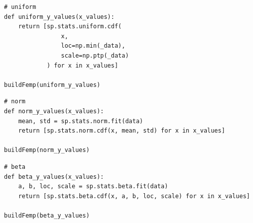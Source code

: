 \documentclass[a4paper, 14pt]{extarticle}
\begin{document}
\begin{lstlisting}
# uniform
def uniform_y_values(x_values):
    return [sp.stats.uniform.cdf(
                x, 
                loc=np.min(_data), 
                scale=np.ptp(_data)
            ) for x in x_values]

buildFemp(uniform_y_values)
\end{lstlisting}

\begin{lstlisting}
# norm 
def norm_y_values(x_values):
    mean, std = sp.stats.norm.fit(data)
    return [sp.stats.norm.cdf(x, mean, std) for x in x_values]

buildFemp(norm_y_values)
\end{lstlisting}

\begin{lstlisting}
# beta 
def beta_y_values(x_values):
    a, b, loc, scale = sp.stats.beta.fit(data)
    return [sp.stats.beta.cdf(x, a, b, loc, scale) for x in x_values]

buildFemp(beta_y_values)
\end{lstlisting}
\end{document}
